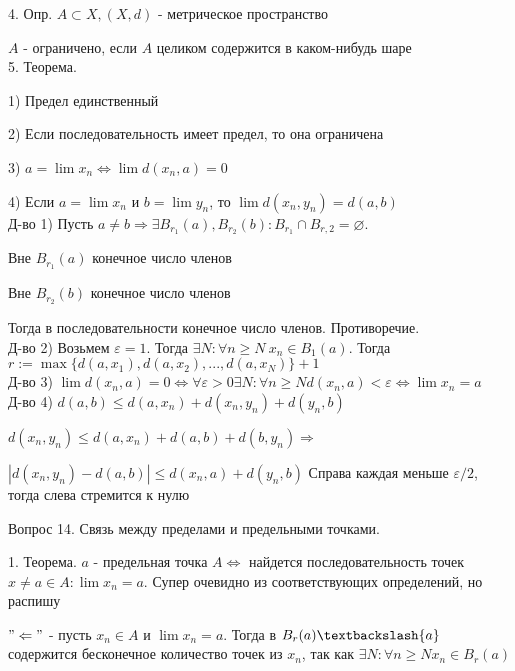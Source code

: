 \documentclass[12pt]{article}
\begin{document}
4. Опр. $A \subset X, (X, d)$ - метрическое пространство

$A$ - ограничено, если $A$ целиком содержится в каком-нибудь шаре\\

5. Теорема.

1) Предел единственный

2) Если последовательность имеет предел, то она ограничена

3) $a=\lim x_n \Leftrightarrow \lim d(x_n, a)=0$

4) Если $a=\lim x_n$ и $b = \lim y_n$, то $\lim d(x_n, y_n) = d(a, b)$\\

Д-во 1) Пусть $a\neq b \Rightarrow \exists B_{r_1}(a), B_{r_2}(b) : B_{r_1} \cap B_{r, 2} = \varnothing$. 

Вне $B_{r_1}(a)$ конечное число членов

Вне $B_{r_2}(b)$ конечное число членов

Тогда в последовательности конечное число членов. Противоречие.\\

Д-во 2) Возьмем $\varepsilon=1$. Тогда $\exists N: \forall n\geq N\ x_n \in B_1(a)$. Тогда $r:= \max\{d(a, x_1), d(a, x_2),..., d(a, x_N)\}+1$\\

Д-во 3) $\lim d(x_n, a)=0 \Leftrightarrow \forall \varepsilon > 0 \exists N : \forall n \geq N d(x_n, a) < \varepsilon \Leftrightarrow \lim x_n = a$\\

Д-во 4) $d(a, b) \leq d(a, x_n)+d(x_n, y_n)+d(y_n, b)$

$d(x_n, y_n) \leq d(a, x_n)+d(a, b)+d(b, y_n) \Rightarrow$

$|d(x_n, y_n)-d(a, b)|\leq d(x_n, a)+d(y_n, b)$ Справа каждая меньше $\varepsilon /2$, тогда слева стремится к нулю
\newpage

\begin{center}
Вопрос 14. Связь между пределами и предельными точками.
\end{center}

1. Теорема. $a$ - предельная точка $A \Leftrightarrow$ найдется последовательность точек $x\neq a \in A : \lim x_n = a$. Супер очевидно из соответствующих определений, но распишу

$"\Leftarrow"$ - пусть $x_n \in A$ и $\lim x_n = a$. Тогда в $B_r(a)\textbackslash \{a\}$ содержится бесконечное количество точек из $x_n$, так как $\exists N : \forall n \geq N x_n \in B_r(a)$\\
\end{document}
